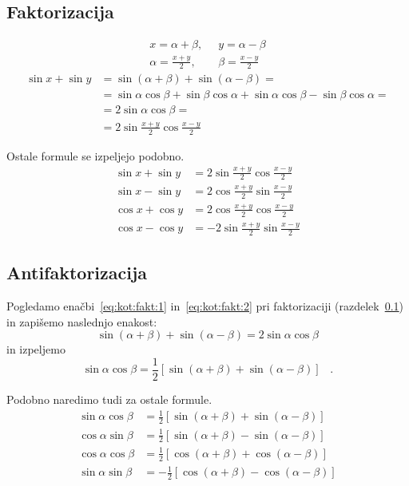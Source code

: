 \documentclass[a4paper,oneside,12pt,fleqn]{article}
\newcommand{\edot}{\;\;\;.}
\def\kos{\cos}
\numberwithin{equation}{section}
\begin{document}
\subsection{Faktorizacija}
\label{sec:kot:fakt}
\begin{align*}
  x=\alpha+\beta,& \;\; y=\alpha-\beta \\
  \alpha = \frac{x+y}{2},& \;\; \beta=\frac{x-y}{2}
\end{align*}
\begin{align}
  \sin{x}+\sin{y} & = \sin(\alpha+\beta) + \sin(\alpha-\beta) = \label{eq:kot:fakt:1} \\
  &=\sin\alpha\kos\beta+\sin\beta\kos\alpha+\sin\alpha\kos\beta-\sin\beta\kos\alpha = \nonumber \\
  &=2\sin\alpha\kos\beta = \label{eq:kot:fakt:2} \\ &= 2\sin\frac{x+y}{2}\kos\frac{x-y}{2} \nonumber
\end{align}

Ostale formule se izpeljejo podobno.
\begin{align*}
  \sin{x} + \sin{y} &= 2\sin\frac{x+y}{2}\cos\frac{x-y}{2} \\
  \sin{x} - \sin{y} &= 2\cos\frac{x+y}{2}\sin\frac{x-y}{2} \\
  \cos{x} + \cos{y} &= 2\cos\frac{x+y}{2}\cos\frac{x-y}{2} \\
  \cos{x} - \cos{y} &=-2\sin\frac{x+y}{2}\sin\frac{x-y}{2}
\end{align*}

\subsection{Antifaktorizacija}
\label{sec:kot:antif}
Pogledamo enačbi~\eqref{eq:kot:fakt:1} in~\eqref{eq:kot:fakt:2} pri faktorizaciji
(razdelek~\ref{sec:kot:fakt}) in zapišemo naslednjo enakost:
\[ \sin(\alpha+\beta) + \sin(\alpha-\beta) = 2\sin\alpha\kos\beta \]
in izpeljemo
\[ \sin\alpha\kos\beta = \frac{1}{2}\left[ \sin(\alpha+\beta) + \sin(\alpha-\beta) \right]
\edot \]

Podobno naredimo tudi za ostale formule.
\begin{align*}
  \sin\alpha\cos\beta &= \frac{1}{2}\left[ \sin(\alpha+\beta)+\sin(\alpha-\beta) \right] \\
  \cos\alpha\sin\beta &= \frac{1}{2}\left[ \sin(\alpha+\beta)-\sin(\alpha-\beta) \right] \\
  \cos\alpha\cos\beta &= \frac{1}{2}\left[ \cos(\alpha+\beta)+\cos(\alpha-\beta) \right] \\
  \sin\alpha\sin\beta &= -\frac{1}{2}\left[ \cos(\alpha+\beta)-\cos(\alpha-\beta)  \right] \\
\end{align*}
\end{document}
